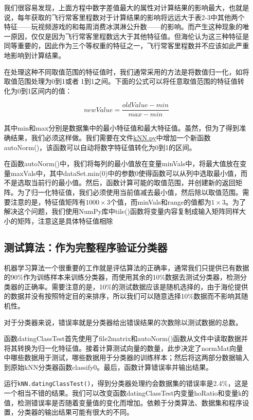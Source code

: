 我们很容易发现，上面方程中数字差值最大的属性对计算结果的影响最大，也就是说，每年获取的飞行常客里程数对于计算结果的影响将远远大于表2-3中其他两个特征——玩视频游戏的和每周消费冰淇淋公升数——的影响。而产生这种现象的唯一原因，仅仅是因为飞行常客里程数远大于其他特征值。但海伦认为这三种特征是同等重要的，因此作为三个等权重的特征之一，飞行常客里程数并不应该如此严重地影响到计算结果。

在处理这种不同取值范围的特征值时，我们通常采用的方法是将数值归一化，如将取值范围处理为0到1或者1到1之间。下面的公式可以将任意取值范围的特征值转化为0到1区间内的值：

$$newValue = \frac{oldValue-min}{max-min}$$

其中min和max分别是数据集中的最小特征值和最大特征值。虽然，但为了得到准确结果，我们必须这样做。我们需要在文件\href{https://github.com/JPL-JUNO/Machine-Learning-in-Action/blob/main/Codes/kNN.py}{kNN.py}中增加一个新函数autoNorm()，该函数可以自动将数字特征值转化为0到1的区间。

在函数autoNorm()中，我们将每列的最小值放在变量minVals中，将最大值放在变量maxVals中，其中dataSet.min(0)中的参数0使得函数可以从列中选取最小值，而不是选取当前行的最小值。然后，函数计算可能的取值范围，并创建新的返回矩阵。为了归一化特征值，我们必须使用当前值减去最小值，然后除以取值范围。需要注意的是，特征值矩阵有$1000\times3$个值，而minVals和range的值都为$1\times3$。为了解决这个问题，我们使用NumPy库中tile()函数将变量内容复制成输入矩阵同样大小的矩阵，注意这是具体特征值相除

\subsection{测试算法：作为完整程序验证分类器}
机器学习算法一个很重要的工作就是评估算法的正确率，通常我们只提供已有数据的90\%作为训练样本来训练分类器，而使用其余的10\%数据去测试分类器，检测分类器的正确率。需要注意的是，10\%的测试数据应该是随机选择的，由于海伦提供的数据并没有按照特定目的来排序，所以我们可以随意选择10\%数据而不影响其随机性。

对于分类器来说，错误率就是分类器给出错误结果的次数除以测试数据的总数。

函数datingClassTest首先使用了file2matrix和autoNorm()函数从文件中读取数据并将其转换为归一化特征值。接着计算测试向量的数量，此步决定了normMat向量中哪些数据用于测试，哪些数据用于分类器的训练样本；然后将这两部分数据输入到原始kNN分类器函数classify0。最后，函数计算错误率并输出结果。

运行\verb|kNN.datingClassTest()|，得到分类器处理约会数据集的错误率是2.4\%，这是一个相当不错的结果。我们可以改变函数datingClassTest内变量hoRatio和变量k的值，检测错误率是否随着变量值的变化而增加。依赖于分类算法、数据集和程序设置，分类器的输出结果可能有很大的不同。
